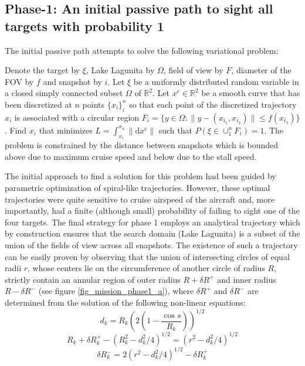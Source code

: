 \subsection{Phase-1: An initial passive path to sight all targets with probability 1}

The initial passive path attempts to solve the following variational problem:

Denote the target by $\xi$, Lake Lagunita by $\Omega$, field of view by $F$, diameter of the FOV by $f$ and snapshot by $i$. Let $\xi$ be a uniformly distributed random variable in a closed simply connected subset $\Omega$ of $\mathbb{R}^2$. Let  $x^c \in \mathbb{R}^2$ be a smooth curve that has been discretized at $n$ points $\{x_i\}_i^n$ so that each point of the discretized trajectory $x_i$ is associated with a circular region $F_i = \{ y \in \Omega : \|y-(x_{i_1},x_{i_2})\| \leq f(x_{i_3})\}$. Find $x_i$ that minimizes $L=\int_{x_i}^{x_n} \| \mathrm{d}x^c\|$ such that $P(\xi \in \cup_1^n F_i) = 1$.
The problem is constrained by the distance between snapshots which is bounded above due to maximum cruise speed and below due to the stall speed.

The initial approach to find a solution for this problem had been guided by parametric optimization of spiral-like trajectories. However, these optimal trajectories were quite sensitive to cruise airspeed of the aircraft and, more importantly, had a finite (although small) probability of failing to sight one of the four targets. The final strategy for phase 1 employs an analytical trajectory which by construction ensures that the search domain (Lake Lagunita) is a subset of the union of the fields of view across all snapshots. The existence of such a trajectory can be easily proven by observing that the union of intersecting circles of equal radii $r$, whose centers lie on the circumference of another circle of radius $R$, strictly contain an annular region of outer radius $R+\delta R^+$ and inner radius $R-\delta R^-$ (see figure \ref{fig_mission_phase1_a}), where $\delta R^+$ and $\delta R^-$ are determined from the solution of the following non-linear equations:
\[ d_k = R_k \left( 2(1- \frac{\cos s}{R_k}) \right)^{1/2} \]
\[ R_k + \delta R_k^+ - \left(R_k^2 - d_k^2/4\right)^{1/2} = \left(r^2 - d_k^2/4\right)^{1/2} \]
\[ \delta R_k^- = 2 \left(r^2 - d_k^2/4\right)^{1/2} - \delta R_k^+ \]

